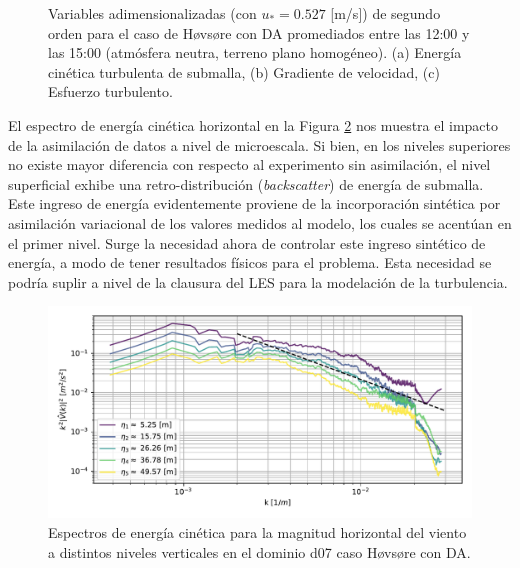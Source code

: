 \begin{figure}[H]
\begin{center}
	\end{center}
	\caption{Variables adimensionalizadas (con $u_* = 0.527$ [m/s]) de segundo orden para el caso de Høvsøre con DA promediados entre las 12:00 y las 15:00 (atmósfera neutra, terreno plano homogéneo). (a) Energía cinética turbulenta de submalla, (b) Gradiente de velocidad, (c) Esfuerzo turbulento. }
	\label{fig:06_hov_da_mean_secondorder}
\end{figure}

El espectro de energía cinética horizontal en la Figura \ref{fig:06_hov_da_spectrum} nos muestra el impacto de la asimilación de datos a nivel de microescala. Si bien, en los niveles superiores no existe mayor diferencia con respecto al experimento sin asimilación, el nivel superficial exhibe una retro-distribución (\emph{backscatter}) de energía de submalla. Este ingreso de energía evidentemente proviene de la incorporación sintética por asimilación variacional de los valores medidos al modelo, los cuales se acentúan en el primer nivel. Surge la necesidad ahora de controlar este ingreso sintético de energía, a modo de tener resultados físicos para el problema. Esta necesidad se podría suplir a nivel de la clausura del LES para la modelación de la turbulencia.

\begin{figure}[H]
	\centering
	\includegraphics[width=1.0\linewidth,page=1,trim={3mm 5mm 3mm 3mm},clip]{Imagenes/06/hov_da/spectra}%
	\caption{Espectros de energía cinética para la magnitud horizontal del viento a distintos niveles verticales en el dominio d07 caso Høvsøre con DA.}
	\label{fig:06_hov_da_spectrum}
\end{figure}

